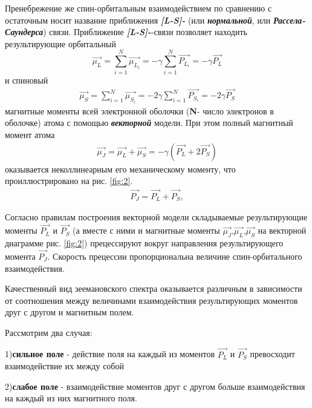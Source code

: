 Пренебрежение же спин-орбитальным взаимодействием по сравнению с остаточным носит название приближения {\itshape\textbf{[L-S]-}} (или {\itshape\textbf{нормальной}}, или {\itshape\textbf{Рассела-Саундерса}}) связи. Приближение {\itshape\textbf{[L-S]-}}-связи позволяет находить результирующие орбитальный
\begin{equation} 
\label{eq:14} 
\vec{\mu_L} = \sum_{i=1}^N \vec{\mu_{L_{i}}}=
-\gamma \sum_{i=1}^N\vec{P_{L_i}}=-\gamma \vec{P_L}
\end{equation}
и спиновый
\begin{gather} 
\label{eq:15} 
\vec{\mu_S} = \sum_{i=1}^N \vec{\mu_{S_{i}}}=-2\gamma \sum_{i=1}^N \vec{P_{S_i}}=-2\gamma \vec{P_S}
\end{gather}
магнитные моменты всей электронной оболочки (\textbf{N}- число электронов в оболочке) атома с помощью {\itshape\textbf{векторной}} модели. При этом полный магнитный момент атома
\begin{gather} 
\label{eq:16} 
\vec{\mu_J} =\vec{\mu_L}+\vec{\mu_S}=-\gamma(\vec{P_L}+2\vec{P_S})
\end{gather}
оказывается неколлинеарным его механическому моменту, что проиллюстрировано на рис. \ref{fig:2}.
\begin{gather} 
\label{eq:17} 
\vec{P_J}=\vec{P_L}+\vec{P_S},
\end{gather}

Согласно правилам построения векторной модели складываемые результирующие моменты $\vec{P_L}$ и $\vec{P_S}$ (а вместе с ними и магнитные моменты $\vec{\mu_J}$,$\vec{\mu_L}$,$\vec{\mu_S}$ на векторной диаграмме рис. \ref{fig:2}) прецессируют вокруг направления результирующего момента $\vec{P_J}$. Скорость прецессии пропорциональна величине спин-орбитального взаимодействия.

Качественный вид зеемановского спектра оказывается различным в зависимости от соотношения между величинами взаимодействия результирующих моментов друг с другом и магнитным полем.

Рассмотрим два случая:

1)\textbf{сильное поле} - действие поля на каждый из моментов $\vec{P_L}$ и $\vec{P_S}$ превосходит взаимодействие их между собой

2)\textbf{слабое поле} - взаимодействие моментов друг с другом больше взаимодействия на каждый из них магнитного поля.

